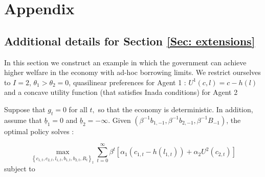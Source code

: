 \documentclass[thmsb,11pt]{article}
\begin{document}
{%
%

\smallskip

\smallskip \pagebreak

\smallskip

\section{Appendix}

\subsection{Additional details for Section \ref{Sec: extensions}}
\label{appndx: borrowing constraints example}
In this section we construct an example in which the government can achieve
higher welfare in the economy with ad-hoc borrowing limits.  We restrict ourselves to $I=2$, $\theta_1>\theta_2=0$, quasilinear preferences for Agent 1 : $U^1(c,l)=c-h(l)$ and a concave utility function (that satisfies Inada conditions) for Agent 2

\smallskip

Suppose that $g_{t}=0$ for all $t,$ so that the economy is deterministic. In addition, assume that $\underline{b}_{1}=0$ and $\underline{b}_{2}=-\infty .$ Given $\left( \beta ^{-1}{b}_{1,-1},\beta ^{-1}{b}%
_{2,-1},\beta ^{-1}{B}_{-1}\right) $, the optimal policy solves :

\begin{equation}
 \label{obj: borrowingconstexample}
 \max_{\left \{ c_{1,t},c_{2,t},l_{1,t},b_{1,t},b_{2,t},R_{t}\right \}
_{t}}\sum_{t=0}^{\infty }\beta ^{t}\left[ \alpha _{1}\left(
c_{1,t}-h(l_{1,t})\right) +\alpha _{2}U^2(c_{2,t})\right]
 \end{equation}
subject to

}
\end{document}
